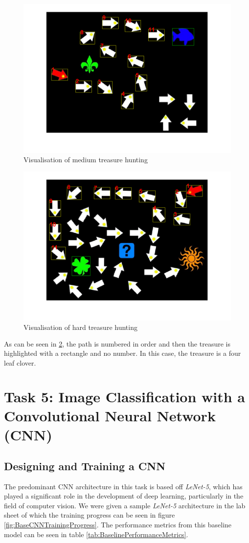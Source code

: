 \documentclass[11pt, letterpaper]{article}
\begin{document}
\begin{figure}[ht]
    \centering
    \includegraphics[width=0.75\linewidth]{Lab 4/MediumVisualSolution.png}
    \caption{Visualisation of medium treasure hunting}
    \label{fig:MediumVisualSolution}
\end{figure}

\begin{figure}[ht]
    \centering
    \includegraphics[width=0.75\linewidth]{Lab 4/HardVisualSolution.png}
    \caption{Visualisation of hard treasure hunting}
    \label{fig:HardVisualSolution}
\end{figure}

As can be seen in \ref{fig:HardVisualSolution}, the path is numbered in order and then the treasure is highlighted with a rectangle and no number. In this case, the treasure is a four leaf clover.

\clearpage
\section{Task 5: Image Classification with a Convolutional Neural Network (CNN)}\label{CNNImageClassifier}
\subsection{Designing and Training a CNN}
The predominant CNN architecture in this task is based off \textit{LeNet-5}, which has played a significant role in the development of deep learning, particularly in the field of computer vision. We were given a sample \textit{LeNet-5} architecture in the lab sheet of which the training progress can be seen in figure \ref{fig:BaseCNNTrainingProgress}. The performance metrics from this baseline model can be seen in table \ref{tab:BaselinePerformanceMetrics}.
\end{document}
